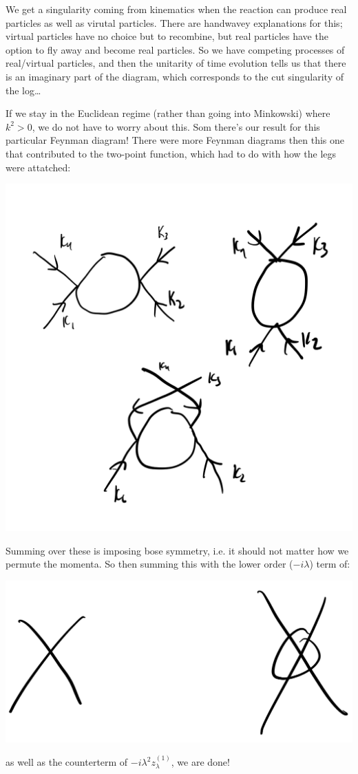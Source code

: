 We get a singularity coming from kinematics when the reaction can produce real particles as well as virutal particles. There are handwavey explanations for this; virtual particles have no choice but to recombine, but real particles have the option to fly away and become real particles. So we have competing processes of real/virtual particles, and then the unitarity of time evolution tells us that there is an imaginary part of the diagram, which corresponds to the cut singularity of the log\dots

If we stay in the Euclidean regime (rather than going into Minkowski) where $k^2 > 0$, we do not have to worry about this. Som there's our result for this particular Feynman diagram! There were more Feynman diagrams then this one that contributed to the two-point function, which had to do with how the legs were attatched:

\begin{center}
    \includegraphics[scale=0.5]{Images/fig-lec29feynman3.png}
\end{center}

Summing over these is imposing bose symmetry, i.e. it should not matter how we permute the momenta. So then summing this with the lower order ($-i\lambda$) term of:
\begin{center}
    \includegraphics[scale=0.5]{Images/fig-lec29feynman4.png}
\end{center}
as well as the counterterm of $-i\lambda^2 z^{(1)}_\lambda$, we are done!

